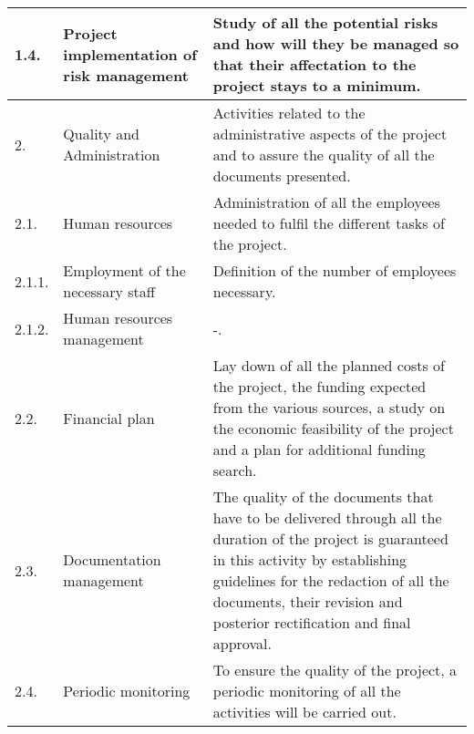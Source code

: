 \begin{longtable}[H]{p{1.5cm} >{\raggedright\arraybackslash}p{4cm} p{8cm}}
	\midrule
	
	1.4. & Project implementation of risk management & Study of all the potential risks and how will they be managed so that their affectation to the project stays to a minimum.\vspace{0.2cm} \\
	
	\midrule
	
	2. & Quality and Administration & Activities related to the administrative aspects of the project and to assure the quality of all the documents presented.\vspace{0.2cm} \\
	
	\midrule
	
	2.1. & Human resources & Administration of all the employees needed to fulfil the different tasks of the project.\vspace{0.2cm} \\
	
	\midrule
	
	2.1.1. & Employment of the necessary staff & Definition of the number of employees necessary.\vspace{0.2cm} \\
	
	\midrule
	
	2.1.2. & Human resources management & -.\vspace{0.2cm} \\
	
	\midrule
	
	2.2. & Financial plan & Lay down of all the planned costs of the project, the funding expected from the various sources, a study on the economic feasibility of the project and a plan for additional funding search.\vspace{0.2cm} \\
	
	\midrule
	
	2.3. & Documentation management & The quality of the documents that have to be delivered through all the duration of the project is guaranteed in this activity by establishing guidelines for the redaction of all the documents, their revision and posterior rectification and final approval.\vspace{0.2cm} \\
	
	\midrule
	
	2.4. & Periodic monitoring & To ensure the quality of the project, a periodic monitoring of all the activities will be carried out.\vspace{0.2cm} \\
	

\end{longtable}

